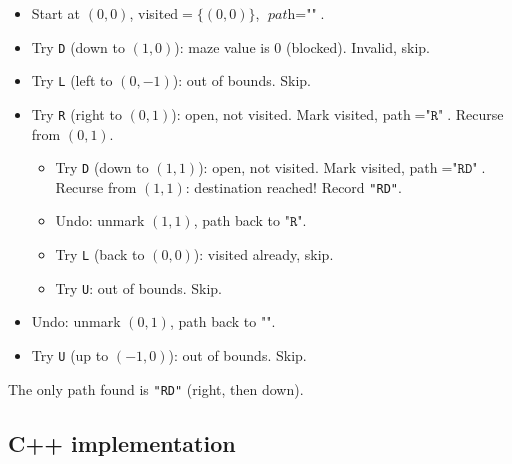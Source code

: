 \begin{itemize}
  \item Start at $(0,0)$, visited$=\{(0,0)\}$,
        $\textit{path}=\texttt{""}$.
  \item Try \texttt{D} (down to $(1,0)$): maze value is $0$ (blocked).
        Invalid, skip.
  \item Try \texttt{L} (left to $(0,-1)$): out of bounds. Skip.
  \item Try \texttt{R} (right to $(0,1)$): open, not visited. Mark
        visited, path$=\texttt{"R"}$. Recurse from $(0,1)$.
  \begin{itemize}
    \item Try \texttt{D} (down to $(1,1)$): open, not visited. Mark
          visited, path$=\texttt{"RD"}$. Recurse from $(1,1)$:
          destination reached! Record \texttt{"RD"}.
    \item Undo: unmark $(1,1)$, path back to $\texttt{"R"}$.
    \item Try \texttt{L} (back to $(0,0)$): visited already, skip.
    \item Try \texttt{U}: out of bounds. Skip.
  \end{itemize}
  \item Undo: unmark $(0,1)$, path back to $\texttt{""}$.
  \item Try \texttt{U} (up to $(-1,0)$): out of bounds. Skip.
\end{itemize}

The only path found is \texttt{"RD"} (right, then down).

\subsection*{C++ implementation}

